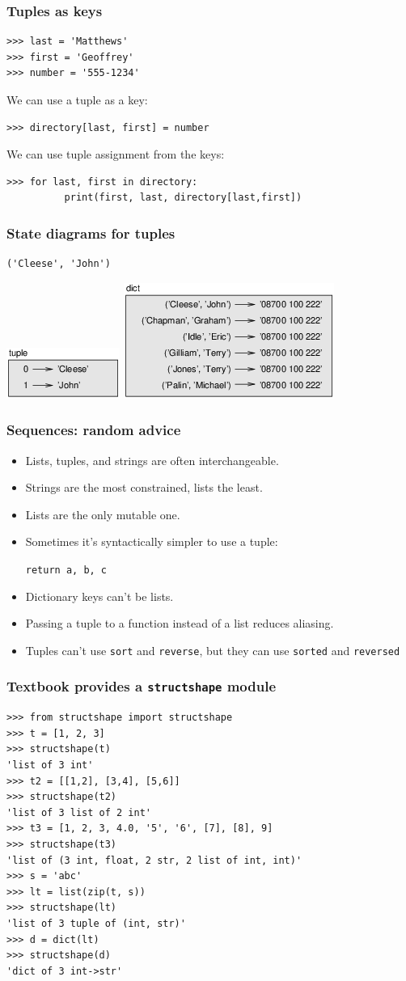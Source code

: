 \documentclass{beamer}
\newcommand{\bi}{\begin{itemize}}
\newcommand{\li}{\item}
\newcommand{\ei}{\end{itemize}}
\newcommand{\bfr}[1]{\begin{frame}[fragile]\frametitle{{ #1 }}}
\begin{document}
\bfr{Tuples as keys}
\begin{lstlisting}
>>> last = 'Matthews'
>>> first = 'Geoffrey'
>>> number = '555-1234'
\end{lstlisting}
We can use a tuple as a key:
\begin{lstlisting}
>>> directory[last, first] = number
\end{lstlisting}
We can use tuple assignment from the keys:
\begin{lstlisting}
>>> for last, first in directory:
          print(first, last, directory[last,first])
\end{lstlisting}
\end{frame}

\bfr{State diagrams for tuples}
\begin{lstlisting}
('Cleese', 'John')
\end{lstlisting}
\includegraphics{statediagram12-01}\hfill
\includegraphics{statediagram12-02}
\end{frame}

\bfr{Sequences: random advice}

\bi
\li Lists, tuples, and strings are often interchangeable.
\li Strings are the most constrained, lists the least.
\li Lists are the only mutable one.
\li Sometimes it's syntactically simpler to use a tuple:

{\lstinline{return a, b, c}}
\li Dictionary keys can't be lists.
\li Passing a tuple to a function instead of a list reduces aliasing.
\li Tuples can't use \lstinline{sort} and \lstinline{reverse}, but
they can use \lstinline{sorted} and \lstinline{reversed}


\ei

\end{frame}

\bfr{Textbook provides a {\tt structshape} module}

\begin{lstlisting}
>>> from structshape import structshape
>>> t = [1, 2, 3]
>>> structshape(t)
'list of 3 int'
>>> t2 = [[1,2], [3,4], [5,6]]
>>> structshape(t2)
'list of 3 list of 2 int'
>>> t3 = [1, 2, 3, 4.0, '5', '6', [7], [8], 9]
>>> structshape(t3)
'list of (3 int, float, 2 str, 2 list of int, int)'
>>> s = 'abc'
>>> lt = list(zip(t, s))
>>> structshape(lt)
'list of 3 tuple of (int, str)'
>>> d = dict(lt) 
>>> structshape(d)
'dict of 3 int->str'
\end{lstlisting}
\end{frame}
\end{document}
